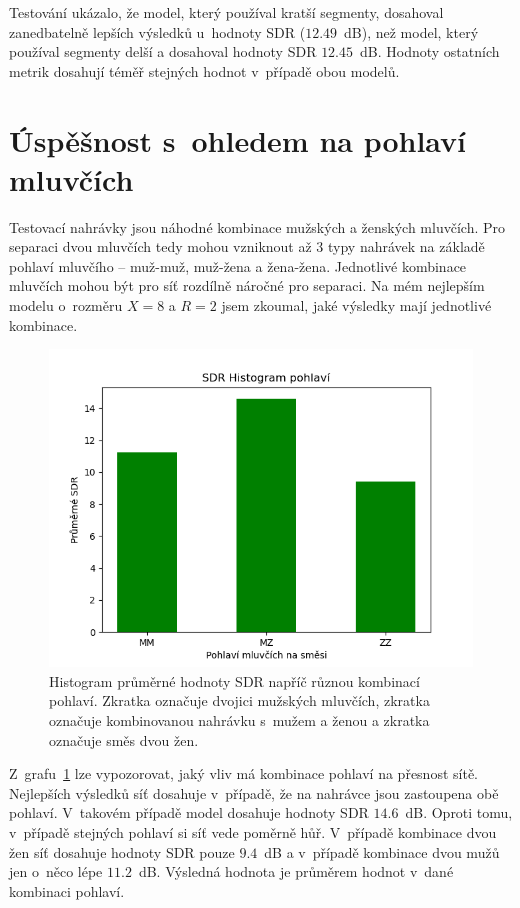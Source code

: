 Testování ukázalo, že model, který používal kratší segmenty, dosahoval zanedbatelně lepších výsledků u~hodnoty SDR ($12.49$~dB), než model, který používal segmenty delší a dosahoval hodnoty SDR $12.45$~dB. Hodnoty ostatních metrik dosahují téměř stejných hodnot v~případě obou modelů.


\section{Úspěšnost s~ohledem na pohlaví mluvčích}
Testovací nahrávky jsou náhodné kombinace mužských a ženských mluvčích. Pro separaci dvou mluvčích tedy mohou vzniknout až 3 typy nahrávek na základě pohlaví mluvčího -- muž-muž, muž-žena a žena-žena. Jednotlivé kombinace mluvčích mohou být pro síť rozdílně náročné pro separaci. Na mém nejlepším modelu o~rozměru $X=8$ a $R=2$ jsem zkoumal, jaké výsledky mají jednotlivé kombinace.

\begin{figure}[H]
    \centering
    \includegraphics[scale=0.8]{obrazky-figures/sdrpohlaviX8R2.png}
    \caption{\label{fig:sdrpohlavi}Histogram průměrné hodnoty SDR napříč různou kombinací pohlaví. Zkratka  označuje dvojici mužských mluvčích, zkratka  označuje kombinovanou nahrávku s~mužem a ženou a zkratka  označuje směs dvou žen.}
\end{figure}

Z~grafu~\ref{fig:sdrpohlavi} lze vypozorovat, jaký vliv má kombinace pohlaví na přesnost sítě. Nejlepších výsledků síť dosahuje v~případě, že na nahrávce jsou zastoupena obě pohlaví. V~takovém případě model dosahuje hodnoty SDR $14.6$~dB. Oproti tomu, v~případě stejných pohlaví si síť vede poměrně hůř. V~případě kombinace dvou žen síť dosahuje hodnoty SDR pouze $9.4$~dB a v~případě kombinace dvou mužů jen o~něco lépe $11.2$~dB. Výsledná hodnota je průměrem hodnot v~dané kombinaci pohlaví.

